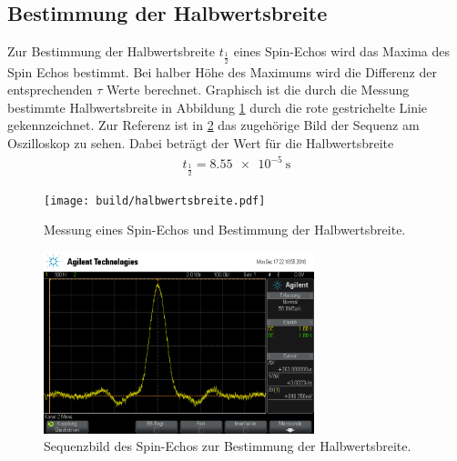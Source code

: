 \subsection{Bestimmung der Halbwertsbreite}
Zur Bestimmung der Halbwertsbreite $t_\frac{1}{2}$ eines Spin-Echos wird das
Maxima des Spin Echos bestimmt. Bei halber Höhe des Maximums wird die Differenz
der entsprechenden $\tau$ Werte berechnet. Graphisch ist die durch die Messung
bestimmte Halbwertsbreite in Abbildung \ref{plt:t12} durch die rote gestrichelte
Linie gekennzeichnet. Zur Referenz ist in \ref{fig:t12} das zugehörige Bild der Sequenz am Oszilloskop zu sehen. Dabei beträgt der Wert für die Halbwertsbreite
\begin{align*}
  t_\frac{1}{2} = \SI{8.55e-5}{\second}
\end{align*}
\begin{figure}[htb]
  \centering
  \texttt{[image: build/halbwertsbreite.pdf]}
  \caption{Messung eines Spin-Echos und Bestimmung der Halbwertsbreite.}
  \label{plt:t12}
\end{figure}
\begin{figure}[htb]
  \centering
  \includegraphics[width=0.7\textwidth]{rohdaten/halbwertsbreite.png}
  \caption{Sequenzbild des Spin-Echos zur Bestimmung der Halbwertsbreite.}
  \label{fig:t12}
\end{figure}
\FloatBarrier

